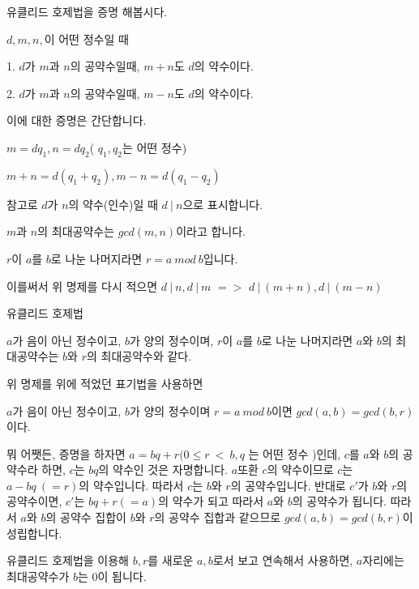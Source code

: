 \documentclass{oblivoir}
\begin{document}
유클리드 호제법을 증명 해봅시다.
\par
\begin{justbox}
$d,m,n,$이 어떤 정수일 때 \par
1. $d$가 $m$과 $n$의 공약수일때, $m+n$도 $d$의 약수이다.
\par
2. $d$가 $m$과 $n$의 공약수일때, $m-n$도 $d$의 약수이다.
\end{justbox}
이에 대한 증명은 간단합니다. \par
$m=dq_1 , n = dq_2$( $q_1,q_2$는 어떤 정수)\par
$m+n = d(q_1 + q_2) , m-n=d(q_1-q_2)$ \par
\vspace{1\baselineskip}
참고로 $d$가 $n$의 약수(인수)일 때 $d\: |\: n$으로 표시합니다.
\par 
$m$과 $n$의 최대공약수는 $gcd(m,n)$이라고 합니다.\par
$r$이 $a$를 $b$로 나눈 나머지라면  $r=a\: mod \:b$입니다. \par
이를써서 위 명제를 다시 적으면 $d\:  |\:  n , d\:  | \: m $ $=>$ $d \: | \: (m+n), d\:  | \: (m-n)$
\par
\begin{justbox}
유클리드 호제법 \par
$a$가 음이 아닌 정수이고, $b$가 양의 정수이며, $r$이 $a$를 $b$로 나눈 나머지라면 $a$와 $b$의 최대공약수는 $b$와 $r$의 최대공약수와 같다.
\end{justbox}
위 명제를 위에 적었던 표기법을 사용하면 \par
$a$가 음이 아닌 정수이고, $b$가 양의 정수이며 $r=a\: mod\: b$이면 $gcd(a,b) = gcd(b,r)$이다.
\par
뭐 어쨋든, 증명을 하자면 $a=bq +r (0 \le r\: <\: b , q$ 는 어떤 정수 )인데, $c$를 $a$와  $b$의 공약수라 하면, $c$는 $bq$의 약수인 것은 자명합니다. $a$또환 $c$의 약수이므로 $c$는 $a-bq\:(=r)$의 약수입니다. 따라서 $c$는 $b$와 $r$의 공약수입니다. 반대로 $c'$가 $b$와 $r$의 공약수이면, $c'$는 $bq+r(=a)$의 약수가 되고 따라서 $a$와 $b$의 공약수가 됩니다. 따라서 $a$와 $b$의 공약수 집합이 $b$와 $r$의 공약수 집합과 같으므로 $gcd(a,b) = gcd(b,r)$이 성립합니다.\par

\vspace{1\baselineskip}
유클리드 호제법을 이용해 $b,r$를 새로운 $a,b$로서 보고 연속해서 사용하면,  $a$자리에는 최대공약수가 $b$는 0이 됩니다.
\end{document}
